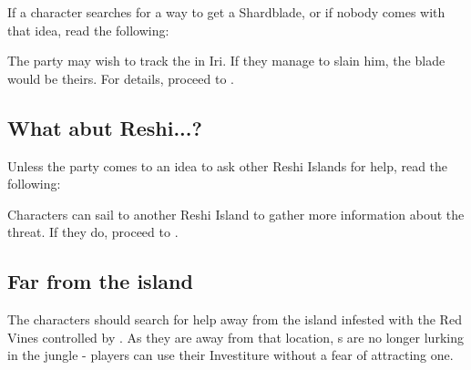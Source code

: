 If a character searches for a way to get a Shardblade, or if nobody comes with that idea, read the following:


The party may wish to track the \enemyRogueShardbearer{} in Iri. If they manage to slain him, the blade would be theirs. For details, proceed to .

\subsection{What abut Reshi...?}
\label{ssec:helpReshi}

Unless the party comes to an idea to ask other Reshi Islands for help, read the following:


Characters can sail to another Reshi Island to gather more information about the threat. If they do, proceed to .

\subsection{Far from the island}

The characters should search for help away from the island infested with the Red Vines controlled by \npcSprenVines{}. As they are away from that location, \enemyLarkin{}s are no longer lurking in the jungle - players can use their Investiture without a fear of attracting one.